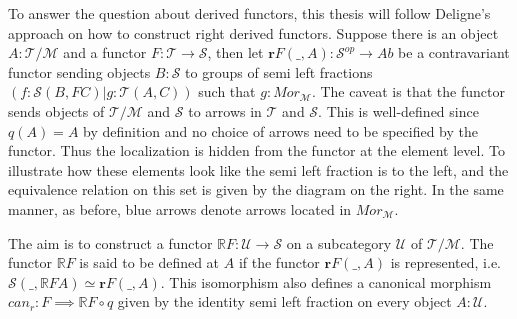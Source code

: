         \begin{center}
        \end{center}

        To answer the question about derived functors, this thesis will follow Deligne's approach on how to construct right derived functors. Suppose there is an object $A:\mathcal{T}/\mathcal{M}$ and a functor $F:\mathcal{T}\rightarrow\mathcal{S}$, then let $\textbf{r}$$F(\_,A):\mathcal{S}^{op}\rightarrow Ab$ be a contravariant functor sending objects $B:\mathcal{S}$ to groups of semi left fractions $(f:\mathcal{S}(B,FC)|g:\mathcal{T}(A,C))$ such that $g:Mor_{\mathcal{M}}$. The caveat is that the functor sends objects of $\mathcal{T}/\mathcal{M}$ and $\mathcal{S}$ to arrows in $\mathcal{T}$ and $\mathcal{S}$. This is well-defined since $q(A)=A$ by definition and no choice of arrows need to be specified by the functor. Thus the localization is hidden from the functor at the element level. To illustrate how these elements look like the semi left fraction is to the left, and the equivalence relation on this set is given by the diagram on the right. In the same manner, as before, blue arrows denote arrows located in $Mor_{\mathcal{M}}$.

        \begin{center}
        \end{center}
        
        The aim is to construct a functor $\mathbb{R}F:\mathcal{U}\rightarrow \mathcal{S}$ on a subcategory $\mathcal{U}$ of $\mathcal{T}/\mathcal{M}$. The functor $\mathbb{R}F$ is said to be defined at $A$ if the functor $\textbf{r} F(\_,A)$ is represented, i.e. $\mathcal{S}(\_,\mathbb{R}FA)\simeq$$\textbf{r}$$F(\_,A)$. This isomorphism also defines a canonical morphism $can_r:F\implies \mathbb{R}F\circ q$ given by the identity semi left fraction on every object $A:\mathcal{U}$.
        
